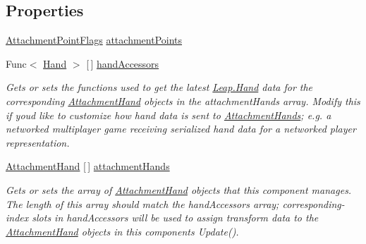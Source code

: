\subsection*{Properties}
\begin{DoxyCompactItemize}
\item 
\mbox{\hyperlink{namespace_leap_1_1_unity_1_1_attachments_a4b32b38f722ad110fcd5a817256e09ab}{Attachment\+Point\+Flags}} \mbox{\hyperlink{class_leap_1_1_unity_1_1_attachments_1_1_attachment_hands_aa5e61a917e83531792e87dee55f5ffd5}{attachment\+Points}}
\item 
Func$<$ \mbox{\hyperlink{class_leap_1_1_hand}{Hand}} $>$ \mbox{[}$\,$\mbox{]} \mbox{\hyperlink{class_leap_1_1_unity_1_1_attachments_1_1_attachment_hands_a7a1f75d54d1823bae8829a9e6e49c176}{hand\+Accessors}}
\begin{DoxyCompactList}\small\item\em Gets or sets the functions used to get the latest \mbox{\hyperlink{class_leap_1_1_hand}{Leap.\+Hand}} data for the corresponding \mbox{\hyperlink{class_leap_1_1_unity_1_1_attachments_1_1_attachment_hand}{Attachment\+Hand}} objects in the attachment\+Hands array. Modify this if you\textquotesingle{}d like to customize how hand data is sent to \mbox{\hyperlink{class_leap_1_1_unity_1_1_attachments_1_1_attachment_hands}{Attachment\+Hands}}; e.\+g. a networked multiplayer game receiving serialized hand data for a networked player representation. \end{DoxyCompactList}\item 
\mbox{\hyperlink{class_leap_1_1_unity_1_1_attachments_1_1_attachment_hand}{Attachment\+Hand}} \mbox{[}$\,$\mbox{]} \mbox{\hyperlink{class_leap_1_1_unity_1_1_attachments_1_1_attachment_hands_a4b6dfa27f95d4e5cb9b33131f5f837cc}{attachment\+Hands}}
\begin{DoxyCompactList}\small\item\em Gets or sets the array of \mbox{\hyperlink{class_leap_1_1_unity_1_1_attachments_1_1_attachment_hand}{Attachment\+Hand}} objects that this component manages. The length of this array should match the hand\+Accessors array; corresponding-\/index slots in hand\+Accessors will be used to assign transform data to the \mbox{\hyperlink{class_leap_1_1_unity_1_1_attachments_1_1_attachment_hand}{Attachment\+Hand}} objects in this component\textquotesingle{}s Update(). \end{DoxyCompactList}\end{DoxyCompactItemize}



